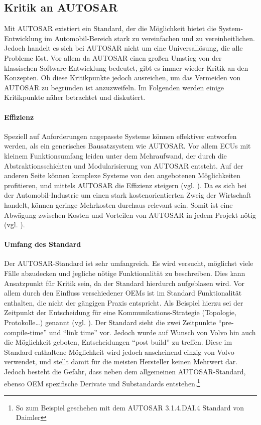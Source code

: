 \documentclass[
  a4paper,					    %
  twoside,
  DIV=calc,     				%
  bibliography=totoc,
  cleardoublepage=empty,
  ngerman,     					%
  final       					%
]{scrbook}
\begin{document}
\subsection{Kritik an AUTOSAR}
\label{sec:kritik_autosar}
Mit AUTOSAR existiert ein Standard, der die Möglichkeit bietet die System-Entwicklung im Automobil-Bereich stark zu vereinfachen und zu vereinheitlichen. Jedoch handelt es sich bei AUTOSAR nicht um eine Universallösung, die alle Probleme löst. Vor allem da AUTOSAR einen großen Umstieg von der klassischen Software-Entwicklung bedeutet, gibt es immer wieder Kritik an den Konzepten. Ob diese Kritikpunkte jedoch ausreichen, um das Vermeiden von AUTOSAR zu begründen ist anzuzweifeln. Im Folgenden werden einige Kritikpunkte näher betrachtet und diskutiert.

\paragraph{Effizienz}
Speziell auf Anforderungen angepasste Systeme können effektiver entworfen werden, als ein generisches Bausatzsystem wie AUTOSAR. Vor allem ECUs mit kleinem Funktionsumfang leiden unter dem Mehraufwand, der durch die Abstraktionsschichten und Modularisierung von AUTOSAR entsteht. Auf der anderen Seite können komplexe Systeme von den angebotenen Möglichkeiten profitieren, und mittels AUTOSAR die Effizienz steigern (vgl. \cite{as_kritik}\cite{wiki:autosar}). Da es sich bei der Automobil-Industrie um einen stark kostenorientierten Zweig der Wirtschaft handelt, können geringe Mehrkosten durchaus relevant sein. Somit ist eine Abwägung zwischen Kosten und Vorteilen von AUTOSAR in jedem Projekt nötig (vgl. \cite[Seite 152]{SE_Autosar}).

\paragraph{Umfang des Standard}
Der AUTOSAR-Standard ist sehr umfangreich. Es wird versucht, möglichst viele Fälle abzudecken und jegliche nötige Funktionalität zu beschreiben. Dies kann Ansatzpunkt für Kritik sein, da der Standard hierdurch aufgeblasen wird. Vor allem durch den Einfluss verschiedener OEMs ist im Standard Funktionalität enthalten, die nicht der gängigen Praxis entspricht. Als Beispiel hierzu sei der Zeitpunkt der Entscheidung für eine Kommunikations-Strategie (Topologie, Protokolle\dots) genannt (vgl. \cite{as_kritik}). Der Standard sieht die zwei Zeitpunkte "`pre-compile-time"' und "`link time"' vor. Jedoch wurde auf Wunsch von Volvo hin auch die Möglichkeit geboten, Entscheidungen "`post build"' zu treffen. Diese im Standard enthaltene Möglichkeit wird jedoch anscheinend einzig von Volvo verwendet, und stellt damit für die meisten Hersteller keinen Mehrwert dar. Jedoch besteht die Gefahr, dass neben dem allgemeinen AUTOSAR-Standard, ebenso OEM spezifische Derivate und Substandards entstehen.\footnote{So zum Beispiel geschehen mit dem AUTOSAR 3.1.4.DAI.4 Standard von Daimler}
\end{document}
